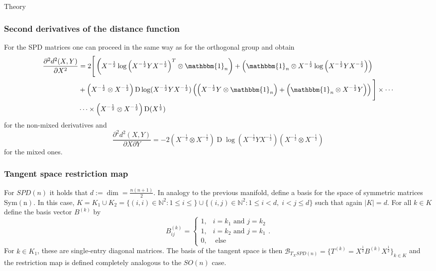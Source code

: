 \begin{chapter}{Theory}
\subsubsection{Second derivatives of the distance function} %
\label{ssub:SecondDerSPD}
For the SPD matrices one can proceed in the same way as for the orthogonal group and obtain
\begin{align}
    \label{eq:spd_xx_der}
    \frac{\partial^2 d^2(X,Y)}{\partial X^2} &= 
    2\Bigg[
	\left(X^{-\frac{1}{2}}\log\left(X^{-\frac{1}{2}}YX^{-\frac{1}{2}}\right)^T\otimes\mathbbm{1}_n\right)
	+\left(\mathbbm{1}_n\otimes X^{-\frac{1}{2}}\log\left(X^{-\frac{1}{2}}YX^{-\frac{1}{2}}\right)\right) \\
    &	+\left(X^{-\frac{1}{2}}\otimes X^{-\frac{1}{2}}\right)\operatorname{D}\log(X^{-\frac{1}{2}}YX^{-\frac{1}{2}})\left( \left(X^{-\frac{1}{2}}Y\otimes\mathbbm{1}_n\right)
	+ \left(\mathbbm{1}_n\otimes X^{-\frac{1}{2}}Y\right)\right) 
    \Bigg] \times\cdots \nonumber \\
    & \cdots\times\left(X^{-\frac{1}{2}}\otimes X^{-\frac{1}{2}}\right)\operatorname{D}(X^{\frac{1}{2}})\nonumber
\end{align}
for the non-mixed derivatives and
\begin{equation}
    \label{eq:spd_xy_der}
    \frac{\partial^2 d^2(X,Y)}{\partial X\partial Y} = -2\left(X^{-\frac{1}{2}}\otimes X^{-\frac{1}{2}}\right)\operatorname{D}\log\left(X^{-\frac{1}{2}}Y X^{-\frac{1}{2}}\right)\left(X^{-\frac{1}{2}}\otimes X^{-\frac{1}{2}}\right)
\end{equation}
for the mixed ones.

\subsubsection{Tangent space restriction map} %
\label{ssub:TangentSPD}
For $SPD(n)$ it holds that $d:=\operatorname{dim}=\frac{n(n+1)}{2}$. In analogy to the previous manifold, define a basis for the space of symmetric matrices 
$\operatorname{Sym(n)}$. In this case, $K= K_1\cup K_2=\lbrace (i,i)\in\mathbb{N}^2: 1\leq i\leq\rbrace \cup \lbrace (i,j)\in\mathbb{N}^2: 1\leq i < d,\; i < j \leq d  \rbrace$
such that again $|K|=d$. For all $k\in K$ define the basis vector $B^{(k)}$ by 
\begin{equation}
    B^{(k)}_{ij}=\begin{cases}
	1, & i=k_1 \text{ and } j=k_2\\
	1, & i=k_2 \text{ and } j=k_1\\
	0, & \text{ else }
    \end{cases}.
\end{equation}
For $k\in K_1$, these are single-entry diagonal matrices.
The basis of the tangent space is then $\mathcal{B}_{T_XSPD(n)}=\lbrace T^{(k)} = X^{\frac{1}{2}}B^{(k)}X^{\frac{1}{2}} \rbrace_{k\in K}$ and the
restriction map is defined completely analogous to the $SO(n)$ case.


\end{chapter}
